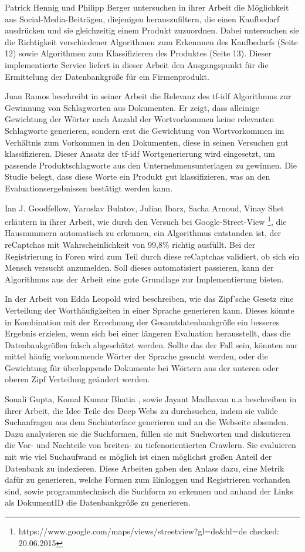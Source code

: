 Patrick Hennig und Philipp Berger \cite{n2o} untersuchen in ihrer Arbeit die Möglichkeit aus Social-Media-Beiträgen, diejenigen herauszufiltern, die einen Kaufbedarf ausdrücken und sie gleichzeitig einem Produkt zuzuordnen. Dabei untersuchen sie die Richtigkeit verschiedener Algorithmen zum Erkennnen des Kaufbedarfs (Seite 12) sowie Algorithmen zum Klassifizieren des Produktes (Seite 13). Dieser implementierte Service liefert in dieser Arbeit den Ausgangspunkt für die Ermittelung der Datenbankgröße für ein Firmenprodukt.

Juan Ramos \cite{ramos2003using} beschreibt in seiner Arbeit die Relevanz des tf-idf Algorithmus zur Gewinnung von Schlagworten aus Dokumenten. Er zeigt, dass alleinige Gewichtung der Wörter nach Anzahl der Wortvorkommen keine relevanten Schlagworte generieren, sondern erst die Gewichtung von Wortvorkommen im Verhältnis zum Vorkommen in den Dokumenten, diese in seinen Versuchen gut klassifizieren. Dieser Ansatz der tf-idf Wortgenerierung wird eingesetzt, um passende Produktschlagworte aus den Unternehmensunterlagen zu gewinnen. Die Studie belegt, dass diese Worte ein Produkt gut klassifizieren, was an den Evaluationsergebnissen bestätigt werden kann.

Ian J. Goodfellow, Yaroslav Bulatov, Julian Ibarz, Sacha Arnoud, Vinay Shet \cite{goodfellow2013multi} erläutern in ihrer Arbeit, wie durch den Versuch bei Google-Street-View \footnote{https://www.google.com/maps/views/streetview?gl=de\&hl=de checked: 20.06.2015}, die Hausnummern automatisch zu erkennen, ein Algorithmus entstanden ist, der reCaptchas mit Wahrscheinlichkeit von 99,8\% richtig ausfüllt. Bei der Registrierung in Foren wird zum Teil durch diese reCaptchas validiert, ob sich ein Mensch versucht anzumelden. Soll dieses automatisiert passieren, kann der Algorithmus aus der Arbeit eine gute Grundlage zur Implementierung bieten.

In der Arbeit von Edda Leopold \cite{leopold2002zipfsche} wird beschreiben, wie das Zipf'sche Gesetz eine Verteilung der Worthäufigkeiten in einer Sprache generieren kann. Dieses könnte in Kombination mit der Errechnung der Gesamtdatenbankgröße ein besseres Ergebnis erzielen, wenn sich bei einer längeren Evaluation herausstellt, dass die Datenbankgrößen falsch abgeschätzt werden. Sollte das der Fall sein, könnten nur mittel häufig vorkommende Wörter der Sprache gesucht werden, oder die Gewichtung für überlappende Dokumente bei Wörtern aus der unteren oder oberen Zipf Verteilung geändert werden. 

Sonali Gupta, Komal Kumar Bhatia \cite{gupta2014comparative}, sowie Jayant Madhavan u.a \cite{madhavan2008google} beschreiben in ihrer Arbeit, die Idee Teile des Deep Webs zu durchsuchen, indem sie valide Suchanfragen aus dem Suchinterface generieren und an die Webseite absenden. Dazu analysieren sie die Suchformen, füllen sie mit Suchworten und diskutieren die Vor- und Nachteile von breiten- zu tiefenorientierten Crawlern. Sie evaluieren mit wie viel Suchaufwand es möglich ist einen möglichst großen Anteil der Datenbank zu indexieren. Diese Arbeiten gaben den Anlass dazu, eine Metrik dafür zu generieren, welche Formen zum Einloggen und Registrieren vorhanden sind, sowie programmtechnisch die Suchform zu erkennen und anhand der Links als DokumentID die Datenbankgröße zu generieren.
